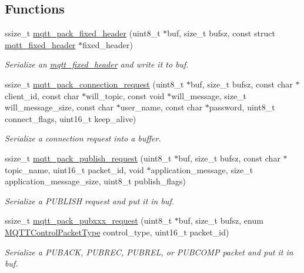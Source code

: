 \subsection*{Functions}
\begin{DoxyCompactItemize}
\item 
ssize\+\_\+t \hyperlink{group__packers_ga52d369e6e7d44539aab6732375288623}{mqtt\+\_\+pack\+\_\+fixed\+\_\+header} (uint8\+\_\+t $\ast$buf, size\+\_\+t bufsz, const struct \hyperlink{structmqtt__fixed__header}{mqtt\+\_\+fixed\+\_\+header} $\ast$fixed\+\_\+header)
\begin{DoxyCompactList}\small\item\em Serialize an \hyperlink{structmqtt__fixed__header}{mqtt\+\_\+fixed\+\_\+header} and write it to {\ttfamily buf}. \end{DoxyCompactList}\item 
ssize\+\_\+t \hyperlink{group__packers_ga327bce82ca8cce7f45e50e0edeb60987}{mqtt\+\_\+pack\+\_\+connection\+\_\+request} (uint8\+\_\+t $\ast$buf, size\+\_\+t bufsz, const char $\ast$client\+\_\+id, const char $\ast$will\+\_\+topic, const void $\ast$will\+\_\+message, size\+\_\+t will\+\_\+message\+\_\+size, const char $\ast$user\+\_\+name, const char $\ast$password, uint8\+\_\+t connect\+\_\+flags, uint16\+\_\+t keep\+\_\+alive)
\begin{DoxyCompactList}\small\item\em Serialize a connection request into a buffer. \end{DoxyCompactList}\item 
ssize\+\_\+t \hyperlink{group__packers_gae7cb4c4d90ed04fe268f5f9a167e32b1}{mqtt\+\_\+pack\+\_\+publish\+\_\+request} (uint8\+\_\+t $\ast$buf, size\+\_\+t bufsz, const char $\ast$topic\+\_\+name, uint16\+\_\+t packet\+\_\+id, void $\ast$application\+\_\+message, size\+\_\+t application\+\_\+message\+\_\+size, uint8\+\_\+t publish\+\_\+flags)
\begin{DoxyCompactList}\small\item\em Serialize a P\+U\+B\+L\+I\+SH request and put it in {\ttfamily buf}. \end{DoxyCompactList}\item 
ssize\+\_\+t \hyperlink{group__packers_ga9cbd954d6bffd8fb0a06a6e4d34e4949}{mqtt\+\_\+pack\+\_\+pubxxx\+\_\+request} (uint8\+\_\+t $\ast$buf, size\+\_\+t bufsz, enum \hyperlink{group__unpackers_gacbd36b88ec7f62bc161b07e1a0aed679}{M\+Q\+T\+T\+Control\+Packet\+Type} control\+\_\+type, uint16\+\_\+t packet\+\_\+id)
\begin{DoxyCompactList}\small\item\em Serialize a P\+U\+B\+A\+CK, P\+U\+B\+R\+EC, P\+U\+B\+R\+EL, or P\+U\+B\+C\+O\+MP packet and put it in {\ttfamily buf}. \end{DoxyCompactList}\item 

\end{DoxyCompactItemize}
